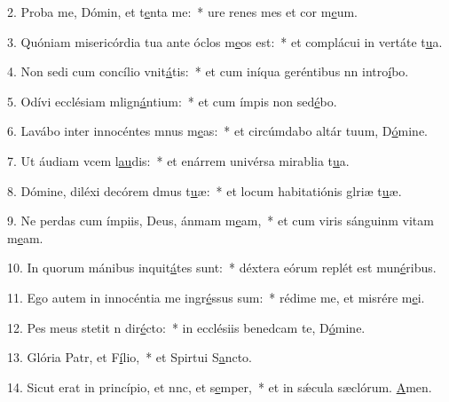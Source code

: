 2. Proba me, Dómin, et t\uline{e}nta me:~* ure renes mes et cor m\uline{e}um.\par 
3. Quóniam misericórdia tua ante óclos m\uline{e}os est:~* et complácui in vertáte t\uline{u}a.\par 
4. Non sedi cum concílio vnit\uline{á}tis:~* et cum iníqua geréntibus nn intro\uline{í}bo.\par 
5. Odívi ecclésiam mlign\uline{á}ntium:~* et cum ímpis non sed\uline{é}bo.\par 
6. Lavábo inter innocéntes mnus m\uline{e}as:~* et circúmdabo altár tuum, D\uline{ó}mine.\par 
7. Ut áudiam vcem l\uline{au}dis:~* et enárrem univérsa mirablia t\uline{u}a.\par 
8. Dómine, diléxi decórem dmus t\uline{u}æ:~* et locum habitatiónis glriæ t\uline{u}æ.\par 
9. Ne perdas cum ímpiis, Deus, ánmam m\uline{e}am,~* et cum viris sánguinm vitam m\uline{e}am.\par 
10. In quorum mánibus inquit\uline{á}tes sunt:~* déxtera eórum replét est mun\uline{é}ribus.\par 
11. Ego autem in innocéntia me ingr\uline{é}ssus sum:~* rédime me, et misrére m\uline{e}i.\par 
12. Pes meus stetit n dir\uline{é}cto:~* in ecclésiis benedcam te, D\uline{ó}mine.\par 
13. Glória Patr, et F\uline{í}lio,~* et Spirtui S\uline{a}ncto.\par 
14. Sicut erat in princípio, et nnc, et s\uline{e}mper,~* et in sǽcula sæclórum. \uline{A}men.\par 
